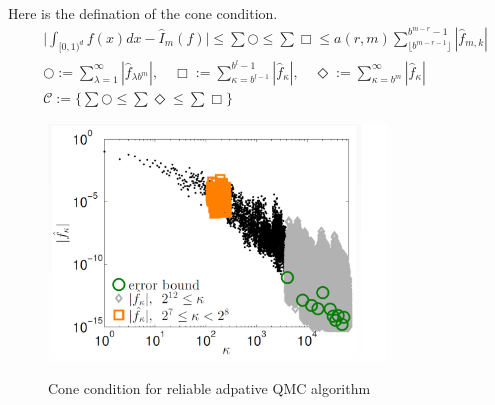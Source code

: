Here is the defination of the cone condition.
\begin{align*}
	&\Big|\int_{[0,1)^d}f(x)dx - \hat{I}_m(f)\Big|
    \leq \sum {\bigcirc} 
	\leq \sum {\Box}
	\leq a(r,m) \sum_{\lfloor b^{m-r-1} \rfloor}^{b^{m-r}-1}|\hat{f}_{m,k}|\\
    &\bigcirc:= \sum_{\lambda=1}^{\infty}| \hat{f}_{\lambda b^m}|,\quad  
    \Box:= \sum_{\kappa=b^{l-1}}^{b^l-1}|\hat{f}_\kappa|,\quad
    \Diamond:=\sum_{\kappa=b^m}^{\infty}|\hat{f}_{\kappa}|\\
    &\mathcal{C}:=\Big\{\sum{\bigcirc} \leq \sum{\Diamond} \leq \sum{\Box}\Big\}
\end{align*}

\begin{figure}[h]
    \centering
    \caption{Cone condition for reliable adpative QMC algorithm}
    \includegraphics[width=0.8\textwidth]{figures/cone.bmp}
    \label{fg:cone}
\end{figure}
